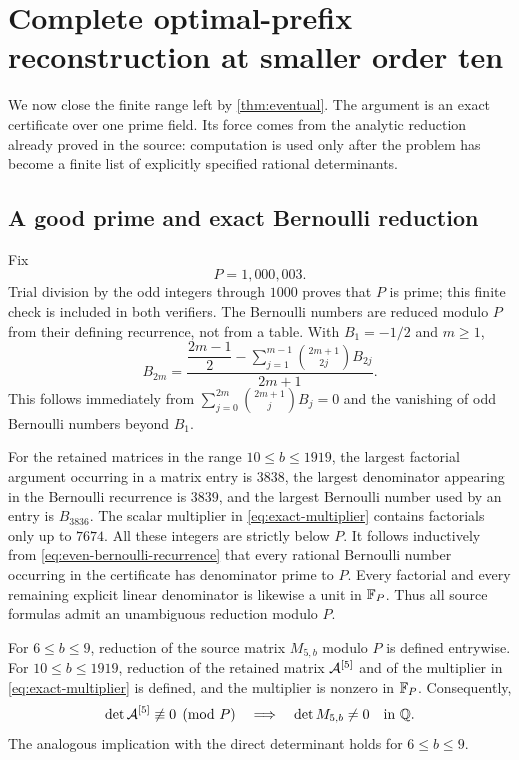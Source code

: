 \section{Complete optimal-prefix reconstruction at smaller order ten}
\label{sec:order-ten}

We now close the finite range left by \cref{thm:eventual}.  The argument
is an exact certificate over one prime field.  Its force comes from the
analytic reduction already proved in the source: computation is used
only after the problem has become a finite list of explicitly specified
rational determinants.

\subsection{A good prime and exact Bernoulli reduction}

Fix
\begin{equation}
 P=1{,}000{,}003.
 \label{eq:certificate-prime}
\end{equation}
Trial division by the odd integers through $1000$ proves that $P$ is
prime; this finite check is included in both verifiers.  The Bernoulli
numbers are reduced modulo $P$ from their defining recurrence, not from
a table.  With $B_1=-1/2$ and $m\ge1$,
\begin{equation}
 B_{2m}=\frac{\dfrac{2m-1}{2}
       -\displaystyle\sum_{j=1}^{m-1}\binom{2m+1}{2j}B_{2j}}
       {2m+1}.
 \label{eq:even-bernoulli-recurrence}
\end{equation}
This follows immediately from
$\sum_{j=0}^{2m}\binom{2m+1}{j}B_j=0$ and the vanishing of odd
Bernoulli numbers beyond $B_1$.

For the retained matrices in the range $10\le b\le1919$, the largest
factorial argument occurring in a matrix entry is $3838$, the largest
denominator appearing in the Bernoulli recurrence is $3839$, and the
largest Bernoulli number used by an entry is $B_{3836}$.  The scalar
multiplier in \eqref{eq:exact-multiplier} contains factorials only up to
$7674$.  All these integers are strictly below $P$.  It follows
inductively from \eqref{eq:even-bernoulli-recurrence} that every rational
Bernoulli number occurring in the certificate has denominator prime to
$P$.  Every factorial and every remaining explicit linear denominator
is likewise a unit in $\mathbb{F}_P$.  Thus all source formulas admit an
unambiguous reduction modulo $P$.

\begin{lemma}
\label{lem:denominator-safe}
For $6\le b\le9$, reduction of the source matrix $M_{5,b}$ modulo $P$
is defined entrywise.  For $10\le b\le1919$, reduction of the retained
matrix $\mathcal{A}^{[5]}$ and of the multiplier in
\eqref{eq:exact-multiplier} is defined, and the multiplier is nonzero in
$\mathbb{F}_P$.  Consequently,
\[
 \det\mathcal{A}^{[5]}\not\equiv0\pmod P
 \quad\Longrightarrow\quad
 \det M_{5,b}\ne0\quad\text{in }\mathbb{Q}.
\]
The analogous implication with the direct determinant holds for
$6\le b\le9$.
\end{lemma}

